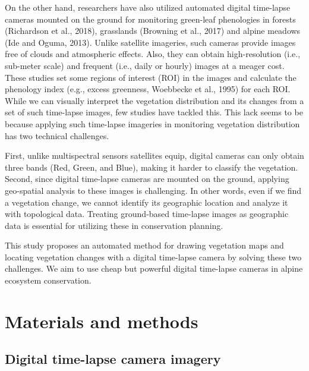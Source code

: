 \documentclass{article}
\begin{document}
On the other hand, researchers have also utilized automated digital
time-lapse cameras mounted on the ground for monitoring green-leaf
phenologies in forests (Richardson et al., 2018), grasslands (Browning
et al., 2017) and alpine meadows (Ide and Oguma, 2013). Unlike satellite
imageries, such cameras provide images free of clouds and atmospheric
effects. Also, they can obtain high-resolution (i.e., sub-meter scale)
and frequent (i.e., daily or hourly) images at a meager cost. These
studies set some regions of interest (ROI) in the images and calculate
the phenology index (e.g., excess greenness, Woebbecke et al., 1995) for
each ROI. While we can visually interpret the vegetation distribution
and its changes from a set of such time-lapse images, few studies have
tackled this. This lack seems to be because applying such time-lapse
imageries in monitoring vegetation distribution has two technical
challenges.

First, unlike multispectral sensors satellites equip, digital cameras
can only obtain three bands (Red, Green, and Blue), making it harder to
classify the vegetation. Second, since digital time-lapse cameras are
mounted on the ground, applying geo-spatial analysis to these images is
challenging. In other words, even if we find a vegetation change, we
cannot identify its geographic location and analyze it with topological
data. Treating ground-based time-lapse images as geographic data is
essential for utilizing these in conservation planning.

This study proposes an automated method for drawing vegetation maps and
locating vegetation changes with a digital time-lapse camera by solving
these two challenges. We aim to use cheap but powerful digital
time-lapse cameras in alpine ecosystem conservation.

\hypertarget{materials-and-methods}{%
\section{Materials and methods}\label{materials-and-methods}}

\hypertarget{digital-time-lapse-camera-imagery}{%
\subsection{Digital time-lapse camera
imagery}\label{digital-time-lapse-camera-imagery}}
\end{document}
